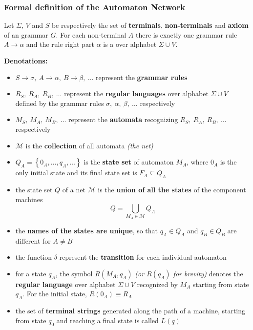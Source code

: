 \documentclass[english]{article}
\begin{document}
\subsubsection{Formal definition of the Automaton Network}

Let \(\Sigma\), \(V\) and \(S\) be respectively the set of \textbf{terminals}, \textbf{non-terminals} and \textbf{axiom} of an \EBNF grammar \(G\).
For each non-terminal \(A\) there is exactly one grammar rule \(A \rightarrow \alpha\) and the rule right part \(\alpha\) is a \re over alphabet \(\Sigma \cup V\).

\textbf{Denotations:}
\begin{itemize}
  \item \(S \rightarrow \sigma, \ A \rightarrow \alpha, \ B \rightarrow \beta, \ \ldots\) represent the \textbf{grammar rules}
  \item \(R_S, \ R_A, \ R_B, \ \ldots\) represent the \textbf{regular languages} over alphabet \(\Sigma \cup V\) defined by the grammar rules \(\sigma, \ \alpha, \ \beta, \ \ldots\) respectively
  \item \(M_S, \ M_A, \ M_B, \ \ldots\) represent the \textbf{automata} recognizing \(R_S, \ R_A, \ R_B, \ \ldots\) respectively
  \item \(\mathcal{M}\) is the \textbf{collection} of all automata \textit{(the net)}
  \item \(Q_A = \left\{ 0_A, \ldots, q_A, \ldots \right\}\) is the \textbf{state set} of automaton \(M_A\), where \(0_A\) is the only initial state and its final state set is \(F_A \subseteq Q_A\)
  \item the state set \(Q\) of a net \(\mathcal{M}\) is the \textbf{union of all the states} of the component machines \[Q = \displaystyle \bigcup_{M_A \in \mathcal{M}} Q_A\]
  \item the \textbf{names of the states are unique}, so that \(q_A \in Q_A\) and \(q_B \in Q_B\) are different for \(A \neq B\)
  \item the function \(\delta\) represent the \textbf{transition} for each individual automaton
  \item for a state \(q_A\), the symbol \(R (M_A, q_A)\) \textit{(or \(R(q_A)\) for brevity)} denotes the \textbf{regular language} over alphabet \(\Sigma \cup V\) recognized by \(M_A\) starting from state \(q_A\). For the initial state, \(R(0_A) \equiv R_A\)
  \item the set of \textbf{terminal strings} generated along the path of a machine, starting from state \(q_0\) and reaching a final state is called \(L(q)\)
\end{itemize}
\end{document}
